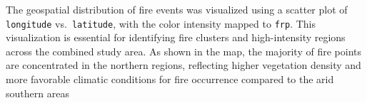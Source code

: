 The geospatial distribution of fire events was visualized using a scatter plot of \texttt{longitude} vs.\ \texttt{latitude}, with the color intensity mapped to \texttt{frp}. This visualization is essential for identifying fire clusters and high-intensity regions across the combined study area.
As shown in the map, the majority of fire points are concentrated in the northern regions, reflecting higher vegetation density and more favorable climatic conditions for fire occurrence compared to the arid southern areas




